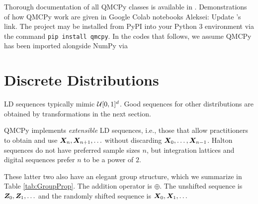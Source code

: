 \documentclass[graybox,footinfo]{svmult}
\newcommand{\AGSComment}[1]{{\color{cyan} Aleksei: #1}}
\begin{document}
Thorough documentation of all QMCPy classes is available in \cite{QMCPyDocs}. Demonstrations of how QMCPy work are given in Google Colab notebooks \cite{QMCPyTutColab2020,QMCPyTutColab2020_paper} \AGSComment{Update \cite{QMCPyTutColab2020_paper}'s link}. The project may be installed from PyPI into your Python 3 environment via the command \texttt{pip install qmcpy}. In the codes that follows, we assume QMCPy has been imported alongside NumPy \cite{numpy} via


\section{Discrete Distributions}

LD sequences typically mimic ${\mathcal{U}}[0,1]^d$.  Good sequences for other distributions are obtained by transformations in the next section.  

QMCPy implements \emph{extensible} LD sequences, i.e., those that allow practitioners to obtain and use ${\boldsymbol{X}}_n, {\boldsymbol{X}}_{n+1}, \ldots $ without discarding ${\boldsymbol{X}}_0, \ldots, {\boldsymbol{X}}_{n-1}$.  Halton sequences do not have preferred sample sizes $n$, but integration lattices and digital sequences prefer $n$ to be a power of $2$.  

These latter two also have an elegant group structure, which we summarize in Table \ref{tab:GroupProp}.  The addition operator  is $\oplus$.  The unshifted sequence is ${\boldsymbol{Z}}_0, {\boldsymbol{Z}}_1, \ldots$ and the randomly shifted sequence is ${\boldsymbol{X}}_0, {\boldsymbol{X}}_1, \ldots$
\end{document}
